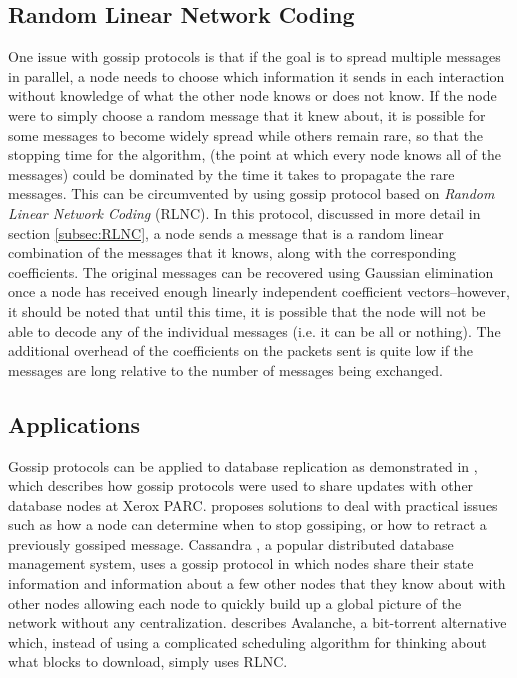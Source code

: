 \documentclass{article} %
\begin{document}
\subsection{Random Linear Network Coding}
One issue with gossip protocols is that if the goal is to spread multiple messages in parallel, a node needs to choose which information it sends in each interaction without knowledge of what the other node knows or does not know. If the node were to simply choose a random message that it knew about, it is possible for some messages to become widely spread while others remain rare, so that the stopping time for the algorithm, (the point at which every node knows all of the messages) could be dominated by the time it takes to propagate the rare messages. This can be circumvented by using gossip protocol based on \emph{Random Linear Network Coding} (RLNC). In this protocol, discussed in more detail in section \ref{subsec:RLNC}, a node sends a message that is a random linear combination of the messages that it knows, along with the corresponding coefficients. The original messages can be recovered using Gaussian elimination once a node has received enough linearly independent coefficient vectors--however, it should be noted that until this time, it is possible that the node will not be able to decode any of the individual messages (i.e. it can be all or nothing). The additional overhead of the coefficients on the packets sent is quite low if the messages are long relative to the number of messages being exchanged.

\subsection{Applications}
Gossip protocols can be applied to database replication as demonstrated in \cite{demers1987epidemic}, which describes how gossip protocols were used to share updates with other database nodes at Xerox PARC. \cite{demers1987epidemic} proposes solutions to deal with practical issues such as how a node can determine when to stop gossiping, or how to retract a previously gossiped message. Cassandra \cite{lakshman2010cassandra}, a popular distributed database management system, uses a gossip protocol in which nodes share their state information and information about a few other nodes that they know about with other nodes allowing each node to quickly build up a global picture of the network without any centralization. \cite{export:67453} describes Avalanche, a bit-torrent alternative which, instead of using a complicated scheduling algorithm for thinking about what blocks to download, simply uses RLNC.
\end{document}
